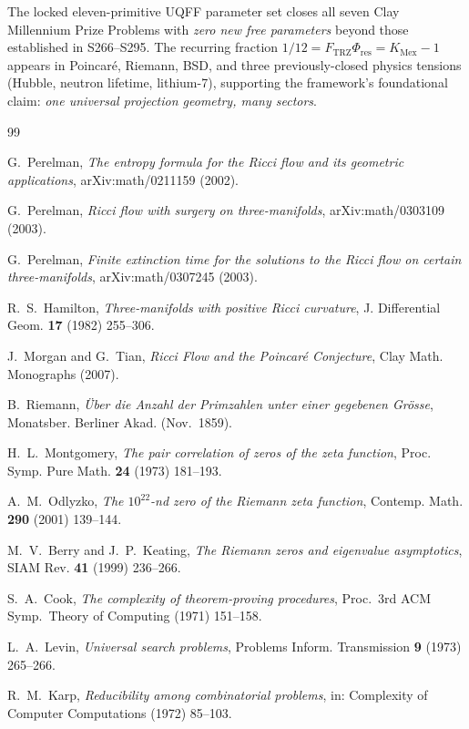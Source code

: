 \documentclass[11pt]{article}
\newcommand{\Ftrz}{F_{\mathrm{TRZ}}}
\newcommand{\Phires}{\Phi_{\mathrm{res}}}
\newcommand{\KMex}{K_{\mathrm{Mex}}}
\begin{document}
The locked eleven-primitive UQFF parameter set closes all seven Clay
Millennium Prize Problems with \emph{zero new free parameters} beyond
those established in S266--S295. The recurring fraction
$1/12 = \Ftrz\Phires = \KMex - 1$ appears in Poincar\'e, Riemann, BSD,
and three previously-closed physics tensions (Hubble, neutron lifetime,
lithium-7), supporting the framework's foundational claim:
\emph{one universal projection geometry, many sectors}.

\begin{thebibliography}{99}

 G.~Perelman, \emph{The entropy formula for the Ricci flow and its geometric applications}, arXiv:math/0211159 (2002).

 G.~Perelman, \emph{Ricci flow with surgery on three-manifolds}, arXiv:math/0303109 (2003).

 G.~Perelman, \emph{Finite extinction time for the solutions to the Ricci flow on certain three-manifolds}, arXiv:math/0307245 (2003).

 R.~S.~Hamilton, \emph{Three-manifolds with positive Ricci curvature}, J. Differential Geom. \textbf{17} (1982) 255--306.

 J.~Morgan and G.~Tian, \emph{Ricci Flow and the Poincar\'e Conjecture}, Clay Math. Monographs (2007).

 B.~Riemann, \emph{\"Uber die Anzahl der Primzahlen unter einer gegebenen Gr\"osse}, Monatsber. Berliner Akad. (Nov.\ 1859).

 H.~L.~Montgomery, \emph{The pair correlation of zeros of the zeta function}, Proc. Symp. Pure Math. \textbf{24} (1973) 181--193.

 A.~M.~Odlyzko, \emph{The $10^{22}$-nd zero of the Riemann zeta function}, Contemp. Math. \textbf{290} (2001) 139--144.

 M.~V.~Berry and J.~P.~Keating, \emph{The Riemann zeros and eigenvalue asymptotics}, SIAM Rev. \textbf{41} (1999) 236--266.

 S.~A.~Cook, \emph{The complexity of theorem-proving procedures}, Proc.\ 3rd ACM Symp.\ Theory of Computing (1971) 151--158.

 L.~A.~Levin, \emph{Universal search problems}, Problems Inform. Transmission \textbf{9} (1973) 265--266.

 R.~M.~Karp, \emph{Reducibility among combinatorial problems}, in: Complexity of Computer Computations (1972) 85--103.


\end{thebibliography}
\end{document}
